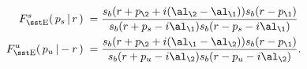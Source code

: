 \begin{equation}\label{basis}\begin{aligned}
F_{\rm\sst E}^s(\,p_s\,|\,r\,)\;=\;& \frac{s_b(r+p_\2+i(\al_\2-\al_\1))s_b(r-p_\1)}{
s_b(r+p_s-i\al_\1)s_b(r-p_s-i\al_\1)} \\
F_{\rm\sst E}^u(\,p_u\,|-r\,)\;=\;& \frac{s_b(r+p_\2+i(\al_\1-\al_\2))s_b(r-p_\1)}{
s_b(r+p_u-i\al_\2)s_b(r-p_u-i\al_\2)}.
\end{aligned}\end{equation}

